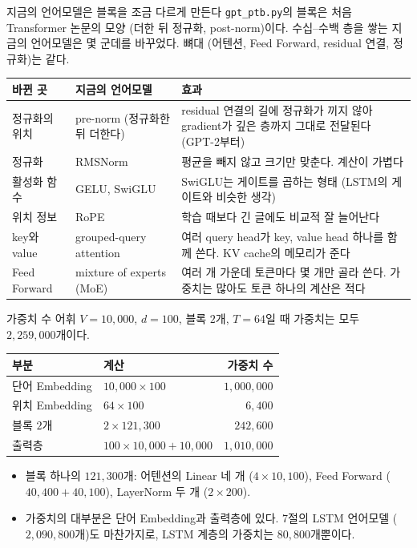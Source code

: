 \documentclass[aspectratio=169,11pt]{beamer}
\begin{document}
\begin{frame}{지금의 언어모델은 블록을 조금 다르게 만든다}
\texttt{gpt\_ptb.py}의 블록은 처음 Transformer 논문의 모양 (더한 뒤 정규화, post-norm)이다.
수십--수백 층을 쌓는 지금의 언어모델은 몇 군데를 바꾸었다.
뼈대 (어텐션, Feed Forward, residual 연결, 정규화)는 같다.
\vskip1mm
\begin{center}
\footnotesize
\begin{tabular}{@{}p{24mm}p{36mm}p{75mm}@{}}
\toprule
바뀐 곳 & 지금의 언어모델 & 효과 \\
\midrule
정규화의 위치 & pre-norm (정규화한 뒤 더한다)
  & residual 연결의 길에 정규화가 끼지 않아 gradient가 깊은 층까지 그대로 전달된다
  (GPT-2부터) \\
정규화 & RMSNorm & 평균을 빼지 않고 크기만 맞춘다. 계산이 가볍다 \\
활성화 함수 & GELU, SwiGLU & SwiGLU는 게이트를 곱하는 형태 (LSTM의 게이트와 비슷한 생각) \\
위치 정보 & RoPE & 학습 때보다 긴 글에도 비교적 잘 늘어난다 \\
key와 value & grouped-query attention
  & 여러 query head가 key, value head 하나를 함께 쓴다. KV cache의 메모리가 준다 \\
Feed Forward & mixture of experts (MoE)
  & 여러 개 가운데 토큰마다 몇 개만 골라 쓴다. 가중치는 많아도 토큰 하나의 계산은 적다 \\
\bottomrule
\end{tabular}
\end{center}
\end{frame}

\begin{frame}{가중치 수}
어휘 $V=10{,}000$, $d=100$, 블록 $2$개, $T=64$일 때 가중치는 모두 $2{,}259{,}000$개이다.
\begin{center}
\begin{tabular}{@{}llr@{}}
\toprule
부분 & 계산 & 가중치 수 \\
\midrule
단어 Embedding & $10{,}000\times100$ & $1{,}000{,}000$ \\
위치 Embedding & $64\times100$ & $6{,}400$ \\
블록 $2$개 & $2\times121{,}300$ & $242{,}600$ \\
출력층 & $100\times10{,}000+10{,}000$ & $1{,}010{,}000$ \\
\bottomrule
\end{tabular}
\end{center}
\begin{itemize}
\item 블록 하나의 $121{,}300$개: 어텐션의 Linear 네 개 ($4\times10{,}100$),
  Feed Forward ($40{,}400+40{,}100$), LayerNorm 두 개 ($2\times200$).
\item 가중치의 대부분은 단어 Embedding과 출력층에 있다.
  7절의 LSTM 언어모델 ($2{,}090{,}800$개)도 마찬가지로, LSTM 계층의 가중치는 $80{,}800$개뿐이다.
\end{itemize}
\end{frame}
\end{document}
